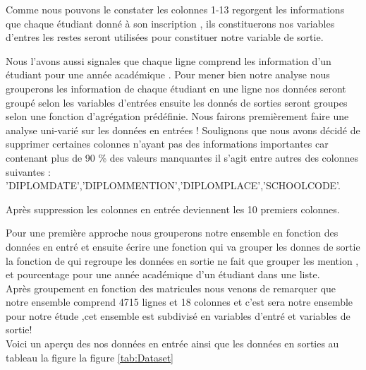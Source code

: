  Comme nous pouvons le constater les colonnes 1-13 regorgent les informations que chaque étudiant donné à son inscription , ils constituerons nos variables d'entres les restes seront utilisées pour constituer notre variable de sortie.

Nous l'avons aussi signales que chaque ligne comprend les information
d'un étudiant pour une année académique . Pour mener bien notre analyse nous grouperons  les information de chaque étudiant en une ligne nos données seront groupé selon les variables d'entrées ensuite les donnés de sorties seront groupes selon une fonction d'agrégation prédéfinie.
Nous fairons premièrement faire une analyse uni-varié  sur les données en entrées !
Soulignons que nous avons décidé de supprimer certaines colonnes n'ayant pas des informations importantes car contenant plus de 90 \% des valeurs manquantes il s'agit entre autres des colonnes suivantes :
'DIPLOMDATE','DIPLOMMENTION','DIPLOMPLACE','SCHOOLCODE'.

Après suppression les colonnes en entrée deviennent les 10 premiers colonnes.

Pour une première approche nous grouperons  notre ensemble en fonction des données en entré et ensuite écrire une fonction qui va grouper les donnes de sortie la fonction de qui regroupe les données en sortie ne fait que grouper les mention , et pourcentage pour une année académique d'un étudiant dans une liste.\\ 
Après groupement en fonction des matricules nous venons de remarquer que
notre ensemble comprend 4715 lignes et 18 colonnes et c'est sera notre ensemble pour notre étude ,cet ensemble est subdivisé en variables d'entré et variables de
sortie!\\
Voici un aperçu des nos données en entrée ainsi que les données en sorties  au tableau la figure la figure \ref{tab:Dataset}
